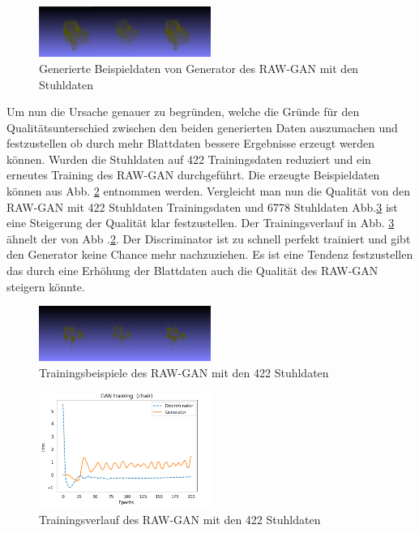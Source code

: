 \documentclass{llncs}
\begin{document}
\begin{figure}[htbp] 
	\centering
	\includegraphics[width=0.5\textwidth]{raw_gan_chair_example.png}
	\caption{Generierte Beispieldaten von Generator des RAW-GAN mit den Stuhldaten}
	\label{fig:Bild58}
\end{figure}

Um nun die Ursache genauer zu begründen, welche die Gründe für  den Qualitätsunterschied zwischen den beiden generierten Daten auszumachen und festzustellen ob durch mehr Blattdaten bessere Ergebnisse erzeugt werden können. Wurden  die Stuhldaten auf 422 Trainingsdaten reduziert und ein erneutes Training des RAW-GAN durchgeführt. Die erzeugte Beispieldaten können aus Abb. \ref{fig:Bild60} entnommen werden. Vergleicht man nun die Qualität von den RAW-GAN mit 422 Stuhldaten Trainingsdaten und 
6778 Stuhldaten  Abb.\ref{fig:Bild59} ist eine Steigerung der Qualität klar festzustellen. Der Trainingsverlauf in Abb. \ref{fig:Bild59} ähnelt der von Abb .\ref{fig:Bild60}. Der Discriminator ist zu schnell perfekt trainiert und gibt den Generator keine Chance mehr nachzuziehen. Es ist eine Tendenz festzustellen das durch eine Erhöhung der Blattdaten auch die Qualität des RAW-GAN steigern könnte.

\begin{figure}[htbp] 
	\centering
	\includegraphics[width=0.5\textwidth]{raw_gan_result_400_result.png}
	\caption{Trainingsbeispiele des RAW-GAN mit den 422 Stuhldaten}
	\label{fig:Bild60}
\end{figure}

\begin{figure}[htbp] 
	\centering
	\includegraphics[width=0.5\textwidth]{raw_gan_result_400_examples.png}
	\caption{Trainingsverlauf des RAW-GAN mit den 422 Stuhldaten}
	\label{fig:Bild59}
\end{figure}
\end{document}
